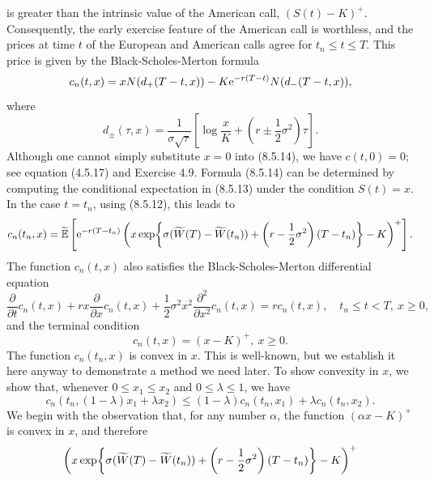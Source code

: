 is greater than the intrinsic value of the American call, \((S(t) - K)^+\). Consequently, the early exercise feature of the American call is worthless, and the prices at time \(t\) of the European and American calls agree for \(t_n \le t \le T\). This price is given by the Black-Scholes-Merton formula
\begin{equation}
	c_n(t, x) = x N(d_+(T - t, x)) - K \e^{-r(T-t)} N(d_-(T - t, x)), \label{eq:BSMFormula}
\end{equation}
where
\[
	d_{\pm}(\tau, x) = \frac{1}{\sigma\sqrt{\tau}} \left[ \log \frac{x}{K} + \left( r \pm \frac{1}{2}\sigma^2 \right) \tau \right].
\]
Although one cannot simply substitute \(x = 0\) into (8.5.14), we have \(c(t, 0) = 0\); see equation (4.5.17) and Exercise 4.9. Formula (8.5.14) can be determined by computing the conditional expectation in (8.5.13) under the condition \(S(t) = x\). In the case \(t = t_n\), using (8.5.12), this leads to
\begin{equation}
	c_n(t_n, x) = \widetilde{\E} \left[ \e^{-r(T-t_n)} \left( x \exp \set[\bigg]{ \sigma (\widetilde{W}(T) - \widetilde{W}(t_n)) + \left( r - \frac{1}{2}\sigma^2 \right) (T - t_n) } - K \right)^+ \right]. \label{eq:ConditionalExpectationTn}
\end{equation}
The function \(c_n(t, x)\) also satisfies the Black-Scholes-Merton differential equation
\begin{equation}
	\frac{\partial}{\partial t} c_n(t, x) + rx \frac{\partial}{\partial x} c_n(t, x) + \frac{1}{2}\sigma^2 x^2 \frac{\partial^2}{\partial x^2} c_n(t, x) = r c_n(t, x), \quad t_n \le t < T, \ x \ge 0, \label{eq:BSMPDE}
\end{equation}
and the terminal condition
\begin{equation}
	c_n(t, x) = (x - K)^+, \ x \ge 0. \label{eq:TerminalCondition}
\end{equation}
The function \(c_n(t_n, x)\) is convex in \(x\). This is well-known, but we establish it here anyway to demonstrate a method we need later. To show convexity in \(x\), we show that, whenever \(0 \le x_1 \le x_2\) and \(0 \le \lambda \le 1\), we have
\begin{equation}
	c_n(t_n, (1 - \lambda)x_1 + \lambda x_2) \le (1 - \lambda)c_n(t_n, x_1) + \lambda c_n(t_n, x_2). \label{eq:ConvexityInequality}
\end{equation}
We begin with the observation that, for any number \(\alpha\), the function \((\alpha x - K)^+\) is convex in \(x\), and therefore
\[
	\left( x \exp \set[\bigg]{ \sigma (\widetilde{W}(T) - \widetilde{W}(t_n)) + \left( r - \frac{1}{2}\sigma^2 \right) (T - t_n) } - K \right)^+
\]

